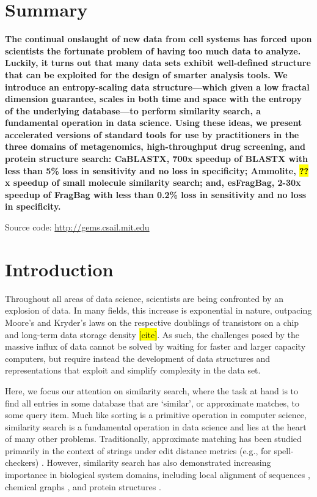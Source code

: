\documentclass[review,preprint,12pt]{elsarticle}
\renewcommand{\cite}{\citep} %
\theoremstyle{definition}
\theoremstyle{remark}
\numberwithin{equation}{section}
\begin{document}
\section{Summary}
{ \bfseries
    The continual onslaught of new data from cell systems has forced upon scientists the fortunate problem of having too much data to analyze.
    Luckily, it turns out that many data sets exhibit well-defined structure that can be exploited for the design of 
smarter analysis tools.
    We introduce an entropy-scaling data structure---which given a low fractal dimension guarantee, scales in both time and space with the entropy of the underlying database---to perform similarity search, a fundamental operation in data science.
    Using these ideas, we present accelerated versions of standard tools for use by practitioners in the three domains of metagenomics, high-throughput drug screening, and protein structure search:
    CaBLASTX, 700x speedup of BLASTX with less than 5\% loss in sensitivity and no loss in specificity; Ammolite, \hl{??}x speedup of small molecule similarity search; and, esFragBag, 2-30x speedup of FragBag with less than 0.2\% loss in sensitivity and no loss in specificity.

    Source code: \url{http://gems.csail.mit.edu}
}

\section{Introduction}
Throughout all areas of data science, scientists are being confronted by an 
explosion of data.
In many fields, this increase is exponential in nature, outpacing Moore's and Kryder's laws on the respective doublings of transistors on a chip and long-term data storage density \hl{[cite]}.
As such, the challenges posed by the massive influx of data cannot be solved by waiting for faster and larger capacity computers, but require instead the development of data structures and representations that exploit and simplify complexity in the data set.

Here, we focus our attention on similarity search, where the task at hand is to find all entries in some database that are `similar', or approximate matches, to some query item.
Much like sorting is a primitive operation in computer science, similarity search is a fundamental operation in data science and lies at the heart of many other problems.
Traditionally, approximate matching has been studied primarily in the context of strings under edit distance metrics (e.g., for spell-checkers) \cite{ukkonen1985algorithms}.
However, similarity search has also demonstrated increasing importance in biological system domains, including local alignment of sequences \cite{altschul1990basic, kent2002blat}, chemical graphs \cite{schaeffer2007graph}, and protein structures \cite{budowski2010fragbag}.
\end{document}
